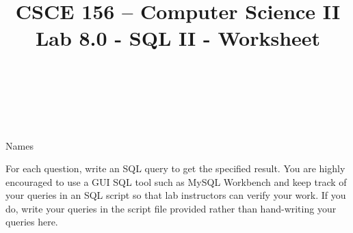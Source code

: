 \documentclass[12pt]{exam}
\title{CSCE 156 -- Computer Science II \\
{\large Lab 8.0 - SQL II - Worksheet}}
\author{~}
\date{~}
\begin{document}
\maketitle

{\Large Names \underline{\hspace*{5cm}}}

For each question, write an SQL query to get the specified result.  You are highly 
encouraged to use a GUI SQL tool such as MySQL Workbench and keep track of your 
queries in an SQL script so that lab instructors can verify your work.  If you do, 
write your queries in the script file provided rather than hand-writing your queries 
here.

\end{document}
